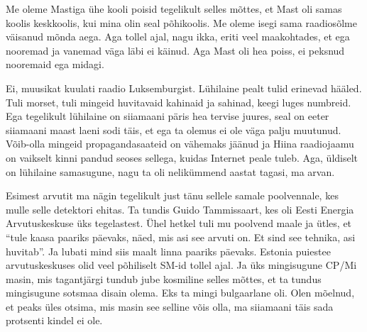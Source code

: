 
Me oleme Mastiga ühe kooli poisid tegelikult selles mõttes, et Mast oli samas 
koolis keskkoolis, kui mina olin seal põhikoolis. Me oleme isegi sama 
raadiosõlme väisanud mõnda aega. Aga tollel ajal, nagu ikka, eriti veel 
maakohtades, et ega nooremad ja vanemad väga läbi ei käinud. Aga Mast oli hea 
poiss, ei peksnud nooremaid ega midagi. 


Ei, muusikat kuulati raadio Luksemburgist. Lühilaine pealt tulid erinevad 
hääled. Tuli morset, tuli mingeid huvitavaid kahinaid ja sahinad, keegi 
luges numbreid. Ega tegelikult lühilaine on siiamaani päris hea tervise 
juures, seal on  eeter siiamaani  maast laeni sodi täis, et ega ta olemus 
ei ole väga palju muutunud. Võib-olla mingeid propagandasaateid on vähemaks 
jäänud ja Hiina raadiojaamu on vaikselt kinni pandud seoses sellega, kuidas 
Internet peale tuleb. Aga, üldiselt on lühilaine samasugune, nagu ta oli 
nelikümmend aastat tagasi, ma arvan.


Esimest arvutit ma nägin tegelikult just tänu sellele samale poolvennale, kes 
mulle selle detektori ehitas. Ta tundis Guido 
Tammissaart, kes oli Eesti Energia 
Arvutuskeskuse üks tegelastest. Ühel 
hetkel tuli mu poolvend maale ja ütles, et \enquote{tule kaasa paariks päevaks, näed, mis asi 
see arvuti on. Et sind see tehnika, asi huvitab}. Ja lubati mind siis maalt 
linna paariks päevaks. Estonia puiestee arvutuskeskuses olid veel põhiliselt 
SM-id tollel ajal. Ja 
üks mingisugune CP/Mi 
masin, mis tagantjärgi tundub jube kosmiline selles mõttes, et ta tundus 
mingisugune sotsmaa disain olema. Eks ta mingi bulgaarlane oli. Olen mõelnud, et 
peaks üles otsima, mis masin see selline võis olla, ma siiamaani täis sada 
protsenti kindel ei ole. 

